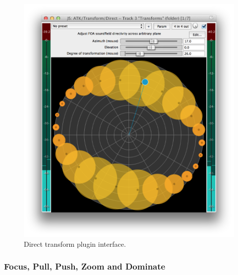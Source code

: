 \documentclass{article}
\begin{document}
\begin{figure}[h]
\captionsetup{aboveskip=-6pt}
\centering
\includegraphics[width=0.9\columnwidth]{figures/directTransform.png}
\caption{Direct transform plugin interface.\label{fig:directTransform}}
\end{figure}



\subsubsection{Focus, Pull, Push, Zoom and Dominate}\label{sec:focus}
\end{document}
